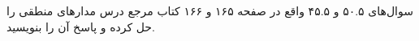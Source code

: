 سوال‌های ۵۰.۵ و ۴۵.۵ واقع در صفحه ۱۶۵ و ۱۶۶ کتاب مرجع درس مدارهای منطقی را حل کرده و پاسخ آن را بنویسید.